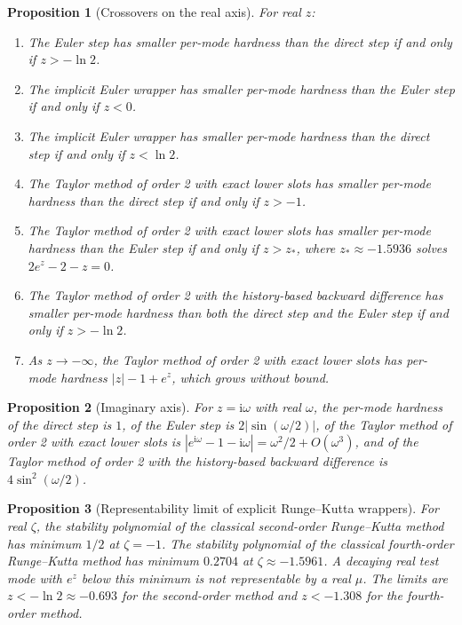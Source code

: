 \documentclass[11pt]{article}
\newtheorem{proposition}{Proposition}
\theoremstyle{definition}
\theoremstyle{remark}
\begin{document}
\begin{proposition}[Crossovers on the real axis]\label{prop:cross}
For real $z$:
\begin{enumerate}[label=(\alph*)]
\item The Euler step has smaller per-mode hardness than the direct step if and only if $z > -\ln 2$.
\item The implicit Euler wrapper has smaller per-mode hardness than the Euler step if and only if $z < 0$.
\item The implicit Euler wrapper has smaller per-mode hardness than the direct step if and only if $z < \ln 2$.
\item The Taylor method of order 2 with exact lower slots has smaller per-mode hardness than the direct step if and only if $z > -1$.
\item The Taylor method of order 2 with exact lower slots has smaller per-mode hardness than the Euler step if and only if $z > z_\ast$, where $z_\ast \approx -1.5936$ solves $2e^{z} - 2 - z = 0$.
\item The Taylor method of order 2 with the history-based backward difference has smaller per-mode hardness than both the direct step and the Euler step if and only if $z > -\ln 2$.
\item As $z \to -\infty$, the Taylor method of order 2 with exact lower slots has per-mode hardness $|z| - 1 + e^z$, which grows without bound.
\end{enumerate}
\end{proposition}

\begin{proposition}[Imaginary axis]\label{prop:imag}
For $z = \mathrm{i}\omega$ with real $\omega$, the per-mode hardness of the direct step is $1$, of the Euler step is $2|\sin(\omega/2)|$, of the Taylor method of order 2 with exact lower slots is $|e^{\mathrm{i}\omega} - 1 - \mathrm{i}\omega| = \omega^2/2 + O(\omega^3)$, and of the Taylor method of order 2 with the history-based backward difference is $4\sin^2(\omega/2)$.
\end{proposition}

\begin{proposition}[Representability limit of explicit Runge--Kutta wrappers]\label{prop:floor}
For real $\zeta$, the stability polynomial of the classical second-order Runge--Kutta method has minimum $1/2$ at $\zeta = -1$.
The stability polynomial of the classical fourth-order Runge--Kutta method has minimum $0.2704$ at $\zeta \approx -1.5961$.
A decaying real test mode with $e^z$ below this minimum is not representable by a real $\mu$.
The limits are $z < -\ln 2 \approx -0.693$ for the second-order method and $z < -1.308$ for the fourth-order method.
\end{proposition}
\end{document}
